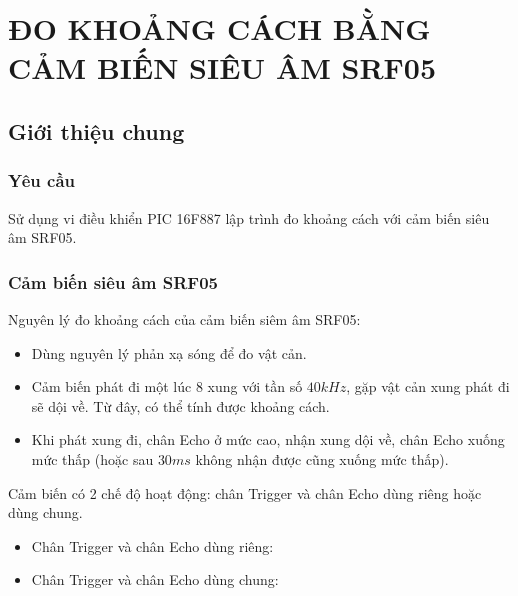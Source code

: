 \chapter{ĐO KHOẢNG CÁCH BẰNG CẢM BIẾN SIÊU ÂM SRF05}
\section{Giới thiệu chung}
\subsection{Yêu cầu}
Sử dụng vi điều khiển PIC 16F887 lập trình đo khoảng cách với cảm biến siêu âm SRF05.
\subsection{Cảm biến siêu âm SRF05}
Nguyên lý đo khoảng cách của cảm biến siêm âm SRF05:
\begin{itemize}
\item Dùng nguyên lý phản xạ sóng để đo vật cản.
\item Cảm biến phát đi một lúc 8 xung với tần số $40kHz$, gặp vật cản xung phát đi sẽ dội về. Từ đây, có thể tính được khoảng cách.
\item Khi phát xung đi, chân Echo ở mức cao, nhận xung dội về, chân Echo xuống mức thấp (hoặc sau $30ms$ không nhận được cũng xuống mức thấp).
\end{itemize}

Cảm biến có 2 chế độ hoạt động: chân Trigger và chân Echo dùng riêng hoặc dùng chung.
\begin{itemize}
\item Chân Trigger và chân Echo dùng riêng:
\item Chân Trigger và chân Echo dùng chung:
\end{itemize}
